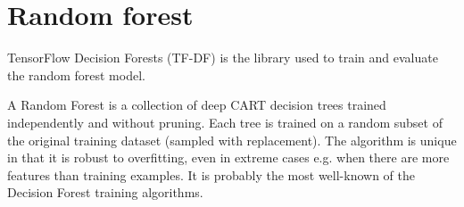 \section{Random forest}

TensorFlow Decision Forests (TF-DF) \cite{TensorFlow:rf} is the library used to train and evaluate the random forest model.

A Random Forest \cite{breiman2001random} is a collection of deep CART decision trees trained independently and without pruning.
Each tree is trained on a random subset of the original training dataset (sampled with replacement).
The algorithm is unique in that it is robust to overfitting, even in extreme cases e.g. when there are more features than training examples.
It is probably the most well-known of the Decision Forest training algorithms.

